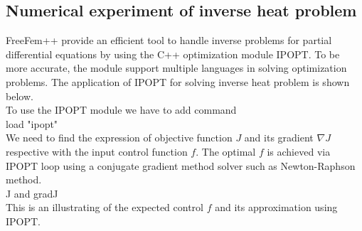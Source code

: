 \subsection{Numerical experiment of inverse heat problem}
FreeFem++ provide an efficient tool to handle inverse problems for partial differential equations by using the C++ optimization module IPOPT. To be more accurate, the module support multiple languages in solving optimization problems. The application of IPOPT for solving inverse heat problem is shown below.\\
To use the IPOPT module we have to add command\\
load "ipopt"\\
We need to find the expression of objective function $J$ and its gradient $\nabla J$ respective with the input control function $f$. The optimal $f$ is achieved via IPOPT loop using a conjugate gradient method solver such as Newton-Raphson method.\\
J and gradJ\\
This is an illustrating of the expected control $f$ and its approximation using IPOPT. 

